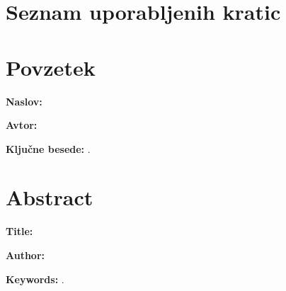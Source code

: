 \pagestyle{empty}
\def\thepage{}%
\tableofcontents{}

\clearemptydoublepage


\chapter*{Seznam uporabljenih kratic}

\noindent

\tseznamkratic

\clearemptydoublepage

\chapter*{Povzetek}

\noindent\textbf{Naslov:} \ttitle
\bigskip

\noindent\textbf{Avtor:} \tauthor
\bigskip

\noindent \tpovzetek

\bigskip

\noindent\textbf{Ključne besede:} \tkeywords.
\clearemptydoublepage

\chapter*{Abstract}

\noindent\textbf{Title:} \ttitleEn
\bigskip

\noindent\textbf{Author:} \tauthor
\bigskip

\noindent \tabstract
\bigskip

\noindent\textbf{Keywords:} \tkeywordsEn.
\clearemptydoublepage